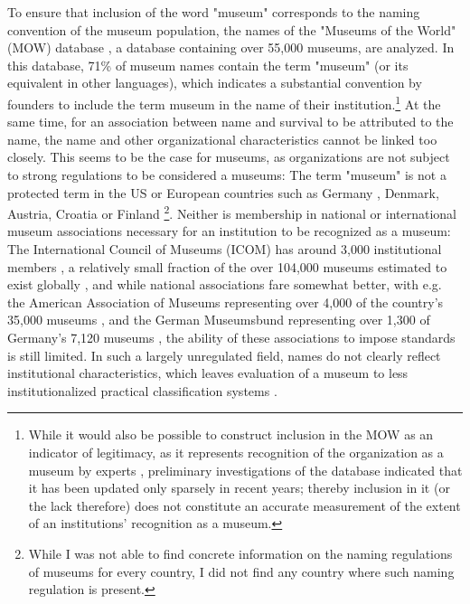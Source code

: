 \documentclass[12pt]{article}
\begin{document}
To ensure that inclusion of the word "museum" corresponds to the naming convention of the museum population, the names of the "Museums of the World" (MOW) database \parencite{deGruyter_2021_MOW}, a database containing over 55,000 museums, are analyzed.
In this database, 71\% of museum names contain the term "museum" (or its equivalent in other languages), which indicates a substantial convention by founders to include the term museum in the name of their institution.\footnote{While it would also be possible to construct inclusion in the MOW as an indicator of legitimacy, as it represents recognition of the organization as a museum by experts \parencite{Zuckerman_1999_illegitimacy}, preliminary investigations of the database indicated that it has been updated only sparsely in recent years; thereby inclusion in it (or the lack therefore) does not constitute an accurate measurement of the extent of an institutions' recognition as a museum.}
At the same time, for an association between name and survival to be attributed to the name, the name and other organizational characteristics cannot be linked too closely.
This seems to be the case for museums, as organizations are not subject to strong regulations to be considered a museums: 
The term "museum" is not a protected term in the US \parencite[p.205]{Moore_2022_best} or European countries such as Germany \parencite[p.4]{Museumsbund_ICOMDE_2006_standards}, Denmark, Austria, Croatia or Finland \parencite{EGMUS_2024_reports}\footnote{While I was not able to find concrete information on the naming regulations of museums for every country, I did not find any country where such naming regulation is present.}.
Neither is membership in national or international museum associations necessary for an institution to be recognized as a museum: 
The International Council of Museums (ICOM) has around 3,000 institutional members \parencite{ICOM_2020_report19}, a relatively small fraction of the over 104,000 museums estimated to exist globally \parencite{UNESCO_2021_covid}, and while national associations fare somewhat better, with e.g. the American Association of Museums representing over 4,000 of the country's 35,000 museums \parencite{LOC_2019_AAM}, and the German Museumsbund representing over 1,300 \parencite{Museumsbund_2024_mitgliedmuseen} of Germany's 7,120 museums \parencite{IMF_2024_museumsstatistik}, the ability of these associations to impose standards is still limited.
In such a largely unregulated field, names do not clearly reflect institutional characteristics, which leaves evaluation of a museum to less institutionalized practical classification systems \parencite{van_Venrooij_2018_fuzziness}.
\end{document}
